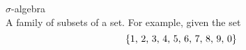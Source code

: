 \newpage

$\sigma$-algebra \\
A family of subsets of a set. For example, given the set
\begin{equation*}
	\{\hbox{1, 2, 3, 4, 5, 6, 7, 8, 9, 0}\}
\end{equation*}


